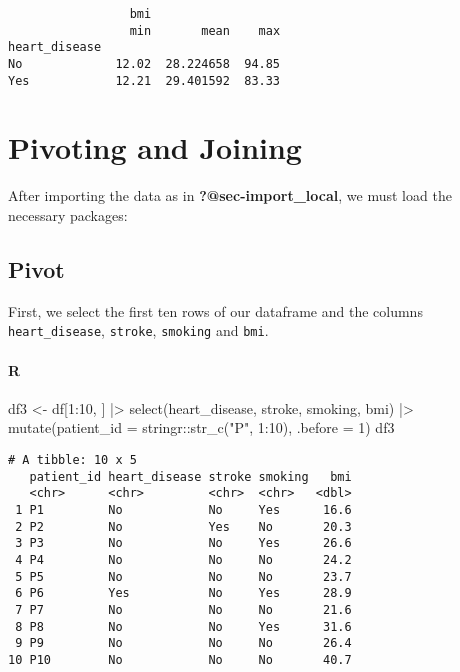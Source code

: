 \documentclass[
  letterpaper,
  DIV=11,
  numbers=noendperiod]{scrreprt}
\newenvironment{Shaded}{\begin{snugshade}}{\end{snugshade}}
\newcommand{\AttributeTok}[1]{\textcolor[rgb]{0.40,0.46,0.14}{#1}}
\newcommand{\DecValTok}[1]{\textcolor[rgb]{0.68,0.00,0.00}{#1}}
\newcommand{\FunctionTok}[1]{\textcolor[rgb]{0.28,0.35,0.67}{#1}}
\newcommand{\NormalTok}[1]{\textcolor[rgb]{0.00,0.46,0.62}{#1}}
\newcommand{\OtherTok}[1]{\textcolor[rgb]{0.00,0.46,0.62}{#1}}
\newcommand{\SpecialCharTok}[1]{\textcolor[rgb]{0.37,0.37,0.37}{#1}}
\newcommand{\StringTok}[1]{\textcolor[rgb]{0.13,0.47,0.30}{#1}}
\begin{document}
\begin{verbatim}
                 bmi                  
                 min       mean    max
heart_disease                         
No             12.02  28.224658  94.85
Yes            12.21  29.401592  83.33
\end{verbatim}

\hypertarget{pivoting-and-joining}{%
\chapter{Pivoting and Joining}\label{pivoting-and-joining}}

After importing the data as in \textbf{?@sec-import\_local}, we must
load the necessary packages:

\hypertarget{pivot}{%
\section{Pivot}\label{pivot}}

First, we select the first ten rows of our dataframe and the columns
\texttt{heart\_disease}, \texttt{stroke}, \texttt{smoking} and
\texttt{bmi}.

\hypertarget{r-30}{%
\subsubsection{R}\label{r-30}}

\begin{Shaded}
\begin{Highlighting}[]
\NormalTok{df3 }\OtherTok{\textless{}{-}}\NormalTok{ df[}\DecValTok{1}\SpecialCharTok{:}\DecValTok{10}\NormalTok{, ] }\SpecialCharTok{|\textgreater{}} 
    \FunctionTok{select}\NormalTok{(heart\_disease, stroke, smoking, bmi) }\SpecialCharTok{|\textgreater{}} 
    \FunctionTok{mutate}\NormalTok{(}\AttributeTok{patient\_id =}\NormalTok{ stringr}\SpecialCharTok{::}\FunctionTok{str\_c}\NormalTok{(}\StringTok{"P"}\NormalTok{, }\DecValTok{1}\SpecialCharTok{:}\DecValTok{10}\NormalTok{), }\AttributeTok{.before =} \DecValTok{1}\NormalTok{)}
\NormalTok{df3}
\end{Highlighting}
\end{Shaded}

\begin{verbatim}
# A tibble: 10 x 5
   patient_id heart_disease stroke smoking   bmi
   <chr>      <chr>         <chr>  <chr>   <dbl>
 1 P1         No            No     Yes      16.6
 2 P2         No            Yes    No       20.3
 3 P3         No            No     Yes      26.6
 4 P4         No            No     No       24.2
 5 P5         No            No     No       23.7
 6 P6         Yes           No     Yes      28.9
 7 P7         No            No     No       21.6
 8 P8         No            No     Yes      31.6
 9 P9         No            No     No       26.4
10 P10        No            No     No       40.7
\end{verbatim}
\end{document}
